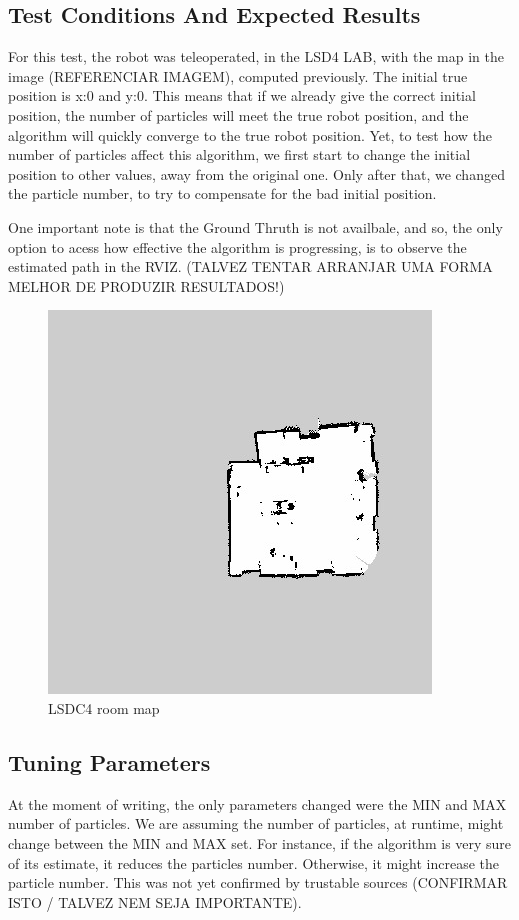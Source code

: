 \subsection{Test Conditions And Expected Results}
For this test, the robot was teleoperated, in the LSD4 LAB, with the map in the image (REFERENCIAR IMAGEM), computed previously. The initial true position is x:0 and y:0. This means that if we already give the correct initial position, the number of particles will meet the true robot position, and the algorithm will quickly converge to the true robot position.
Yet, to test how the number of particles affect this algorithm, we first start to change the initial position to other values, away from the original one. Only after that, we changed the particle number, to try to compensate for the bad initial position.

One important note is that the Ground Thruth is not availbale, and so, the only option to acess how effective the algorithm is progressing, is to observe the estimated path in the RVIZ. (TALVEZ TENTAR ARRANJAR UMA FORMA MELHOR DE PRODUZIR RESULTADOS!)


\begin{figure}[h]
\centering
\vspace{3pt}
\includegraphics[scale=0.4]{./Images/2023-09-18-10-18-29}
\caption{LSDC4 room map}
\label{fig:flowchart}
\end{figure}


\subsection{Tuning Parameters}
At the moment of writing, the only parameters changed were the MIN and MAX number of particles. We are assuming the number of particles, at runtime, might change between the MIN and MAX set. For instance, if the algorithm is very sure of its estimate, it reduces the particles number. Otherwise, it might increase the particle number. This was not yet confirmed by trustable sources (CONFIRMAR ISTO / TALVEZ NEM SEJA IMPORTANTE).

